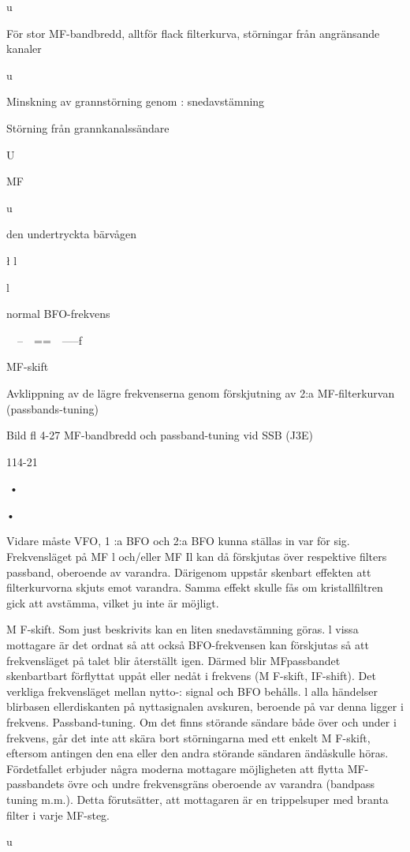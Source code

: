 u

För stor MF-bandbredd, alltför
flack filterkurva, störningar från
angränsande kanaler

u

Minskning av grannstörning genom :
snedavstämning

Störning från grannkanalssändare

U

MF

u

den undertryckta
bärvågen

\l
l

l

normal BFO-frekvens

~~--~~==~~-----f

MF-skift

Avklippning av de lägre frekvenserna
genom förskjutning av 2:a MF-filterkurvan (passbands-tuning)

Bild fl 4-27 MF-bandbredd och passband-tuning vid SSB (J3E)

114-21

•

•

Vidare måste VFO, 1 :a BFO och 2:a BFO
kunna ställas in var för sig. Frekvensläget
på MF l och/eller MF Il kan då förskjutas
över respektive filters passband, oberoende av varandra. Därigenom uppstår
skenbart effekten att filterkurvorna skjuts
emot varandra. Samma effekt skulle fås
om kristallfiltren gick att avstämma, vilket
ju inte är möjligt.

M F-skift. Som just beskrivits kan en liten
snedavstämning göras. l vissa mottagare
är det ordnat så att också BFO-frekvensen kan förskjutas så att frekvensläget på
talet blir återställt igen. Därmed blir MFpassbandet skenbartbart förflyttat uppåt
eller nedåt i frekvens (M F-skift, IF-shift).
Det verkliga frekvensläget mellan nytto-:
signal och BFO behålls. l alla händelser
blirbasen ellerdiskanten på nyttasignalen
avskuren, beroende på var denna ligger
i frekvens.
Passband-tuning. Om det finns störande
sändare både över och under i frekvens,
går det inte att skära bort störningarna
med ett enkelt M F-skift, eftersom antingen den ena eller den andra störande
sändaren ändåskulle höras. Fördetfallet
erbjuder några moderna mottagare möjligheten att flytta MF-passbandets övre
och undre frekvensgräns oberoende av
varandra (bandpass tuning m.m.). Detta
förutsätter, att mottagaren är en trippelsuper med branta filter i varje MF-steg.

u


